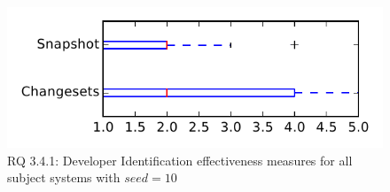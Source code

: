 
\begin{figure}
\centering
\includegraphics[height=0.4\textheight]{figures/dit_seed/rq1_tiny_10}
\caption{RQ 3.4.1: Developer Identification effectiveness measures for all subject systems with $seed=10$}
\label{fig:dit_seed:rq1:tiny}
\end{figure}
